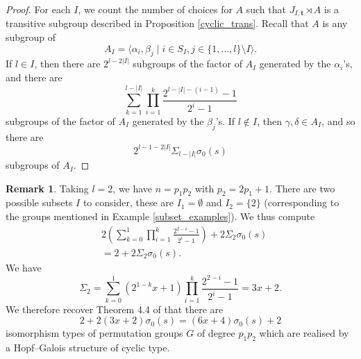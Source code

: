 \documentclass[a4paper,reqno]{amsart}
\theoremstyle{definition}
\newtheorem{remark}[theorem]{Remark}
\newcommand{\bt}{\textbf{t}}
\begin{document}
\begin{proof}
    For each $I$, we count the number of choices for $A$ such that $J_{I,\bt}\rtimes A$ is a transitive subgroup described in Proposition \ref{cyclic_trans}. Recall that $A$ is any subgroup of
    \[A_I=\langle \alpha_i,\beta_j \mid i \in S_I,j \in \{1,\ldots,l\} \setminus I \rangle.\]
    If $l \in I$, then there are $2^{l-2|I|}$ subgroups of the factor of $A_I$ generated by the $\alpha_i$'s, and there are
     \[\sum_{k=1}^{l-|I|}\prod_{i=1}^k\frac{2^{l-|I|-(i-1)}-1}{2^i-1}\]
    subgroups of the factor of $A_I$ generated by the $\beta_j$'s. If $l \notin I$, then $\gamma,\delta \in A_I$, and so there are
    \[2^{l-1-2|I|}\Sigma_{l-|I|}\sigma_0(s)\]
    subgroups of $A_I$.
\end{proof}
\begin{remark}\label{cyclic_SG}
    Taking $l=2$, we have $n=p_1p_2$ with $p_2=2p_1+1$. There are two possible subsets $I$ to consider, these are $I_1=\emptyset$ and $I_2=\{2\}$ (corresponding to the groups mentioned in Example \ref{subset_examples}). We thus compute
    \begin{align*}
	&2\left(\sum_{k=0}^1\prod_{i=1}^k\frac{2^{2-i}-1}{2^i-1}\right)+2\Sigma_2\sigma_0(s)\\
	&=2+2\Sigma_2\sigma_0(s).
    \end{align*}
    We have
    \[\Sigma_2=\sum_{k=0}^1(2^{1-k}x+1)\prod_{i=1}^k\frac{2^{2-i}-1}{2^i-1}=3x+2.\]
    We therefore recover Theorem 4.4 of \cite{BML21} that there are
    \[2+2(3x+2)\sigma_0(s)=(6x+4)\sigma_0(s)+2\]
    isomorphism types of permutation groups $G$ of degree $p_1p_2$ which are realised by a Hopf--Galois structure of cyclic type.
\end{remark}
\end{document}
